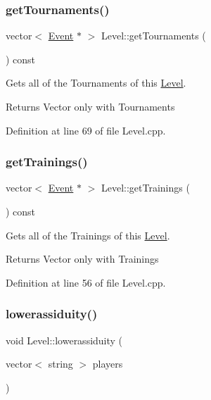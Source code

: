 \subsubsection{\texorpdfstring{get\+Tournaments()}{getTournaments()}}
{\footnotesize\ttfamily vector$<$ \hyperlink{class_event}{Event} $\ast$ $>$ Level\+::get\+Tournaments (\begin{DoxyParamCaption}{ }\end{DoxyParamCaption}) const}



Gets all of the Tournaments of this \hyperlink{class_level}{Level}. 

\begin{DoxyReturn}{Returns}
Vector only with Tournaments 
\end{DoxyReturn}


Definition at line 69 of file Level.\+cpp.

\hypertarget{class_level_a58a416953fdf79d4b6388cd6bd0b4e95}{}\label{class_level_a58a416953fdf79d4b6388cd6bd0b4e95} 
\subsubsection{\texorpdfstring{get\+Trainings()}{getTrainings()}}
{\footnotesize\ttfamily vector$<$ \hyperlink{class_event}{Event} $\ast$ $>$ Level\+::get\+Trainings (\begin{DoxyParamCaption}{ }\end{DoxyParamCaption}) const}



Gets all of the Trainings of this \hyperlink{class_level}{Level}. 

\begin{DoxyReturn}{Returns}
Vector only with Trainings 
\end{DoxyReturn}


Definition at line 56 of file Level.\+cpp.

\hypertarget{class_level_ab4e4b8c386063fd8244042f7eefa3427}{}\label{class_level_ab4e4b8c386063fd8244042f7eefa3427} 
\subsubsection{\texorpdfstring{lowerassiduity()}{lowerassiduity()}}
{\footnotesize\ttfamily void Level\+::lowerassiduity (\begin{DoxyParamCaption}\item[{vector$<$ string $>$}]{players }\end{DoxyParamCaption})}



